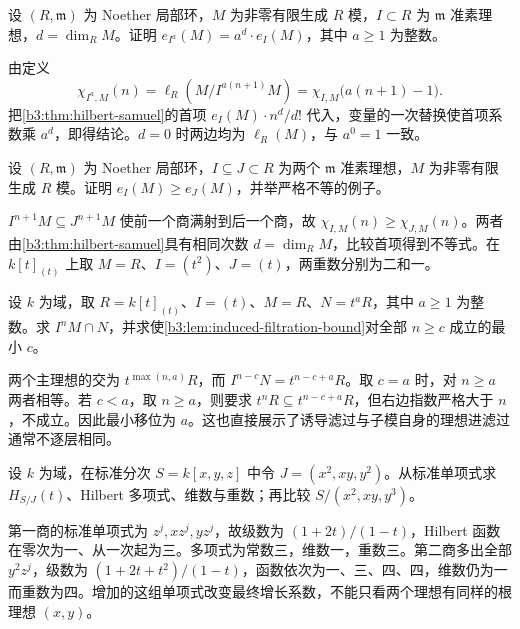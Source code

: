 \begin{exercise}\label{b3:ex:11-power-multiplicity}
	设 \((R,\mathfrak m)\) 为 Noether 局部环，\(M\) 为非零有限生成 \(R\) 模，\(I\subset R\) 为 \(\mathfrak m\) 准素理想，\(d=\dim_RM\)。证明 \(e_{I^a}(M)=a^d\cdot e_I(M)\)，其中 \(a\ge1\) 为整数。
\end{exercise}
\begin{solution}
	由定义
	\[
		\chi_{I^a,M}(n)=\ell_R\left(M/I^{a(n+1)}M\right) =\chi_{I,M}\bigl(a(n+1)-1\bigr).
	\]
	把\cref{b3:thm:hilbert-samuel}的首项 \(e_I(M)\cdot n^d/d!\) 代入，变量的一次替换使首项系数乘 \(a^d\)，即得结论。\(d=0\) 时两边均为 \(\ell_R(M)\)，与 \(a^0=1\) 一致。
\end{solution}

\begin{exercise}\label{b3:ex:11-inclusion-multiplicity}
	设 \((R,\mathfrak m)\) 为 Noether 局部环，\(I\subseteq J\subset R\) 为两个 \(\mathfrak m\) 准素理想，\(M\) 为非零有限生成 \(R\) 模。证明 \(e_I(M)\ge e_J(M)\)，并举严格不等的例子。
\end{exercise}
\begin{solution}
	\(I^{n+1}M\subseteq J^{n+1}M\) 使前一个商满射到后一个商，故 \(\chi_{I,M}(n)\ge\chi_{J,M}(n)\)。两者由\cref{b3:thm:hilbert-samuel}具有相同次数 \(d=\dim_RM\)，比较首项得到不等式。在 \(k[t]_{(t)}\) 上取 \(M=R\)、\(I=(t^2)\)、\(J=(t)\)，两重数分别为二和一。
\end{solution}

\begin{exercise}\label{b3:ex:11-filtration-shift}
	设 \(k\) 为域，取 \(R=k[t]_{(t)}\)、\(I=(t)\)、\(M=R\)、\(N=t^aR\)，其中 \(a\ge1\) 为整数。求 \(I^nM\cap N\)，并求使\cref{b3:lem:induced-filtration-bound}对全部 \(n\ge c\) 成立的最小 \(c\)。
\end{exercise}
\begin{solution}
	两个主理想的交为 \(t^{\max(n,a)}R\)，而 \(I^{n-c}N=t^{n-c+a}R\)。取 \(c=a\) 时，对 \(n\ge a\) 两者相等。若 \(c<a\)，取 \(n\ge a\)，则要求 \(t^nR\subseteq t^{n-c+a}R\)，但右边指数严格大于 \(n\)，不成立。因此最小移位为 \(a\)。这也直接展示了诱导滤过与子模自身的理想进滤过通常不逐层相同。
\end{solution}


\begin{exercise}\label{b3:ex:11-monomial-hilbert-count}
	设 \(k\) 为域，在标准分次 \(S=k[x,y,z]\) 中令 \(J=(x^2,xy,y^2)\)。从标准单项式求 \(H_{S/J}(t)\)、Hilbert 多项式、维数与重数；再比较 \(S/(x^2,xy,y^3)\)。
\end{exercise}
\begin{solution}
	第一商的标准单项式为 \(z^j,xz^j,yz^j\)，故级数为 \((1+2t)/(1-t)\)，Hilbert 函数在零次为一、从一次起为三。多项式为常数三，维数一，重数三。第二商多出全部 \(y^2z^j\)，级数为 \((1+2t+t^2)/(1-t)\)，函数依次为一、三、四、四，维数仍为一而重数为四。增加的这组单项式改变最终增长系数，不能只看两个理想有同样的根理想 \((x,y)\)。
\end{solution}

